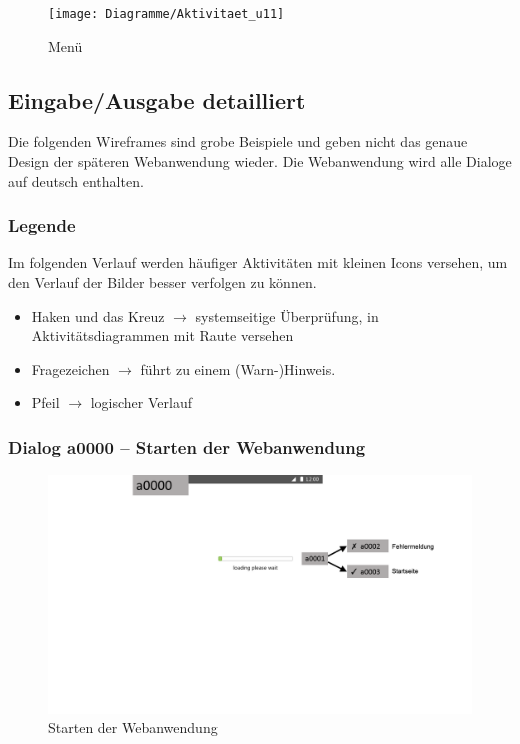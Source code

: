 \documentclass[a4paper,12pt,oneside]{scrartcl}
\begin{document}
\begin{figure}[!htbp]
\centering
\noindent\texttt{[image: Diagramme/Aktivitaet\_u11]}
\caption{Menü}
\end{figure}
\FloatBarrier


\subsection{Eingabe/Ausgabe detailliert}
Die folgenden Wireframes sind grobe Beispiele und geben nicht das genaue Design der späteren Webanwendung wieder.
Die Webanwendung wird alle Dialoge auf deutsch enthalten.

\subsubsection*{Legende}
Im folgenden Verlauf werden häufiger Aktivitäten mit kleinen Icons versehen, um den Verlauf der Bilder besser verfolgen zu können.
\begin{itemize}
	\item Haken und das Kreuz $\rightarrow$  systemseitige Überprüfung, in Aktivitätsdiagrammen mit Raute versehen
	\item Fragezeichen $\rightarrow$ führt zu einem (Warn-)Hinweis.
	\item Pfeil $\rightarrow$ logischer Verlauf
\end{itemize}

\subsubsection{Dialog a0000 – Starten der Webanwendung}
\begin{figure}[!htbp]
\centering
\noindent\includegraphics[width=\linewidth,height=\textheight,keepaspectratio]{Dialoge/a0000}
\caption{Starten der Webanwendung}
\end{figure}
\FloatBarrier
\end{document}
